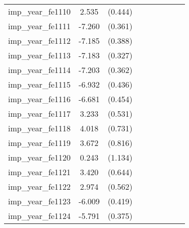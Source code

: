 {\begin{tabular}{l*{4}{cc}}
imp\_year\_fe1110&    2.535\sym{***}&  (0.444)&                  &         &                  &         &                  &         \\
imp\_year\_fe1111&   -7.260\sym{***}&  (0.361)&                  &         &                  &         &                  &         \\
imp\_year\_fe1112&   -7.185\sym{***}&  (0.388)&                  &         &                  &         &                  &         \\
imp\_year\_fe1113&   -7.183\sym{***}&  (0.327)&                  &         &                  &         &                  &         \\
imp\_year\_fe1114&   -7.203\sym{***}&  (0.362)&                  &         &                  &         &                  &         \\
imp\_year\_fe1115&   -6.932\sym{***}&  (0.436)&                  &         &                  &         &                  &         \\
imp\_year\_fe1116&   -6.681\sym{***}&  (0.454)&                  &         &                  &         &                  &         \\
imp\_year\_fe1117&    3.233\sym{***}&  (0.531)&                  &         &                  &         &                  &         \\
imp\_year\_fe1118&    4.018\sym{***}&  (0.731)&                  &         &                  &         &                  &         \\
imp\_year\_fe1119&    3.672\sym{***}&  (0.816)&                  &         &                  &         &                  &         \\
imp\_year\_fe1120&    0.243         &  (1.134)&                  &         &                  &         &                  &         \\
imp\_year\_fe1121&    3.420\sym{***}&  (0.644)&                  &         &                  &         &                  &         \\
imp\_year\_fe1122&    2.974\sym{***}&  (0.562)&                  &         &                  &         &                  &         \\
imp\_year\_fe1123&   -6.009\sym{***}&  (0.419)&                  &         &                  &         &                  &         \\
imp\_year\_fe1124&   -5.791\sym{***}&  (0.375)&                  &         &                  &         &                  &         \\

\end{tabular}}
